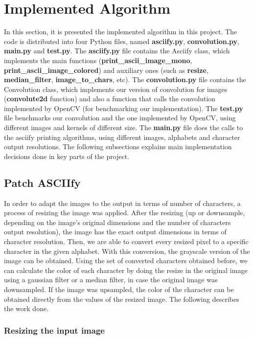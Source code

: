 \documentclass[]{IEEEtran}
\begin{document}
\section{Implemented Algorithm}
In this section, it is presented the implemented algorithm in this project. The code is distributed into four Python files, named \textbf{asciify.py}, \textbf{convolution.py}, \textbf{main.py} and \textbf{test.py}. The \textbf{asciify.py} file contains the Asciify class, which implements the main functions (\textbf{print\_ascii\_image\_mono}, \textbf{print\_ascii\_image\_colored}) and auxiliary ones (such as \textbf{resize}, \textbf{median\_filter}, \textbf{image\_to\_chars}, etc). The \textbf{convolution.py} file contains the Convolution class, which implements our version of convolution for images (\textbf{convolute2d} function) and also a function that calls the convolution implemented by OpenCV (for benchmarking our implementation). The \textbf{test.py} file benchmarks our convolution and the one implemented by OpenCV, using different images and kernels of different size. The \textbf{main.py} file does the calls to the asciify printing algorithms, using different images, alphabets and character output resolutions. The following subsections explains main implementation decisions done in key parts of the project.


\subsection{Patch ASCIIfy}
In order to adapt the images to the output in terms of number of characters, a process of resizing the image was applied. After the resizing (up or downsample, depending on the image's original dimensions and the number of characters output resolution), the image has the exact output dimensions in terms of character resolution.  Then, we are able to convert every resized pixel to a specific character in the given alphabet. With this conversion, the grayscale version of the image can be obtained. Using the set of converted characters obtained before, we can calculate the color of each character by doing the resize in the original image using a gaussian filter or a median filter, in case the original image was downsampled. If the image was upsampled, the color of the character can be obtained directly from the values of the resized image. The following describes the work done.


\subsubsection{Resizing the input image}
\end{document}
